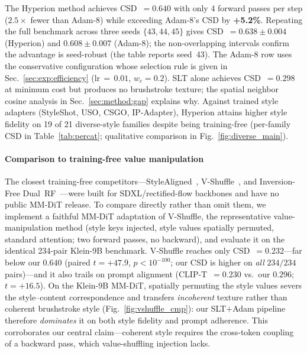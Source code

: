 The Hyperion method achieves CSD~$= 0.640$ with only 4 forward passes per step
($2.5\times$ fewer than Adam-8) while exceeding Adam-8's CSD by \textbf{+5.2\%}.
Repeating the full benchmark across three seeds $\{43, 44, 45\}$ gives
CSD~$= 0.638 \pm 0.004$ (Hyperion) and $0.608 \pm 0.007$ (Adam-8); the
non-overlapping intervals confirm the advantage is seed-robust (the table
reports seed~43).
The Adam-8 row uses the conservative configuration
whose selection rule is given in Sec.~\ref{sec:exp:efficiency}
(lr$\,{=}\,0.01$, $w_c{=}0.2$).  %
SLT alone achieves CSD~$= 0.298$ at minimum cost but produces no brushstroke
texture; the spatial neighbor cosine analysis in Sec.~\ref{sec:method:gap}
explains why.
Against trained style adapters (StyleShot, USO, CSGO, IP-Adapter), Hyperion
attains higher style fidelity on 19 of 21 diverse-style families despite being
training-free (per-family CSD in Table~\ref{tab:percat};
qualitative comparison in Fig.~\ref{fig:diverse_main}).

\paragraph{Comparison to training-free value manipulation}
The closest training-free competitors---StyleAligned~\cite{hertz2024style},
V-Shuffle~\cite{vshuffle2025}, and Inversion-Free Dual~RF~\cite{dualrf2025}---were
built for SDXL/rectified-flow backbones and have no public MM-DiT release.
To compare directly rather than omit them, we implement a faithful MM-DiT
adaptation of V-Shuffle, the representative value-manipulation method (style
keys injected, style values spatially permuted, standard attention; two forward
passes, no backward), and evaluate it on the identical 234-pair Klein-9B
benchmark.
V-Shuffle reaches only CSD~$=0.232$---far below our $0.640$ (paired
$t{=}{+}47.9$, $p<10^{-100}$; our CSD is higher on \emph{all} $234/234$ pairs)---and
it also trails on prompt alignment (CLIP-T~$=0.230$ vs.\ our $0.296$;
$t{=}{+}16.5$).
On the Klein-9B MM-DiT, spatially permuting the style values severs the
style--content correspondence and transfers \emph{incoherent} texture rather than
coherent brushstroke style (Fig.~\ref{fig:vshuffle_cmp}): our SLT$+$Adam pipeline
therefore \emph{dominates} it on both style fidelity and prompt adherence.
This corroborates our central claim---coherent style requires the cross-token
coupling of a backward pass, which value-shuffling injection lacks.

